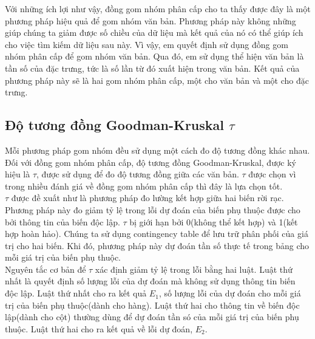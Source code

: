 \hspace*{10mm}Với những ích lợi như vậy, đồng gom nhóm phân cấp cho ta thấy được đây là một phương pháp hiệu quả để gom nhóm văn bản. Phương pháp này không những giúp chúng ta giảm được số chiều của dữ liệu mà kết quả của nó có thể giúp ích cho việc tìm kiếm dữ liệu sau này. Vì vậy, em quyết định sử dụng đồng gom nhóm phân cấp để gom nhóm văn bản. Qua đó, em sử dụng thể hiện văn bản là tần số của đặc trưng, tức là số lần từ đó xuất hiện trong văn bản. Kết quả của phương pháp này sẽ là hai gom nhóm phân cấp, một cho văn bản và một cho đặc trưng. \\

\subsection{Độ tương đồng Goodman-Kruskal $\tau$}
\noindent
\hspace{10mm}Mỗi phương pháp gom nhóm đều sử dụng một cách đo độ tương đồng khác nhau. Đối với đồng gom nhóm phân cấp, độ tương đồng Goodman-Kruskal, được ký hiệu là $\tau$, được sử dụng để đo độ tương đồng giữa các văn bản. $\tau$ được chọn vì trong nhiều đánh giá về đồng gom nhóm phân cấp thì đây là lựa chọn tốt.\\

\hspace*{10mm}$\tau$ được đề xuất như là phương pháp đo lường kết hợp giữa hai biến rời rạc. Phương pháp này đo giảm tỷ lệ trong lỗi dự đoán của biến phụ thuộc được cho bởi thông tin của biến độc lập. $\tau$ bị giới hạn bởi 0(không thể kết hợp) và 1(kết hợp hoàn hảo).
Chúng ta sử dụng contingency table để lưu trữ phân phối của giá trị cho hai biến. Khi đó, phương pháp này dự đoán tần số thực tế trong bảng cho mỗi giá trị của biến phụ thuộc.\\

\hspace*{10mm}Nguyên tắc cơ bản để $\tau$ xác định giảm tỷ lệ trong lỗi bằng hai luật. Luật thứ nhất là quyết định số lượng lỗi của dự đoán mà không sử dụng thông tin biến độc lập. Luật thứ nhất cho ra kết quả $E_1$, số lượng lỗi của dự đoán cho mỗi giá trị của biến phụ thuộc(dành cho hàng). Luật thứ hai cho thông tin về biến độc lập(dành cho cột) thường dùng để dự đoán tần só của mỗi giá trị của biến phụ thuộc. Luật thứ hai cho ra kết quả về lỗi dự đoán, $E_2$.\\

